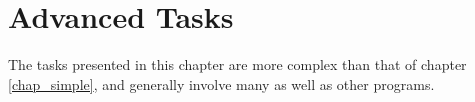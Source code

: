 \chapter{Advanced Tasks}
\label{chap_adv}

The tasks presented in this chapter are more complex than that of chapter
\ref{chap_simple}, and generally involve many \nutils{} as well as other
programs.








